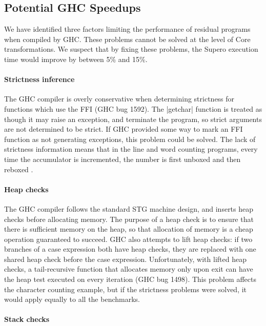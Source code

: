 \documentclass{llncs}
\begin{document}
\subsection{Potential GHC Speedups}

We have identified three factors limiting the performance of residual programs when compiled by GHC. These problems cannot be solved at the level of Core transformations. We suspect that by fixing these problems, the Supero execution time would improve by between 5\% and 15\%.

\paragraph{Strictness inference}

The GHC compiler is overly conservative when determining strictness for functions which use the FFI (GHC bug 1592). The |getchar| function is treated as though it may raise an exception, and terminate the program, so strict arguments are not determined to be strict. If GHC provided some way to mark an FFI function as not generating exceptions, this problem could be solved. The lack of strictness information means that in the line and word counting programs, every time the accumulator is incremented, the number is first unboxed and then reboxed \cite{spj:unboxing}.

\paragraph{Heap checks}

The GHC compiler follows the standard STG machine \cite{spj:implementation} design, and inserts heap checks before allocating memory. The purpose of a heap check is to ensure that there is sufficient memory on the heap, so that allocation of memory is a cheap operation guaranteed to succeed. GHC also attempts to lift heap checks: if two branches of a case expression both have heap checks, they are replaced with one shared heap check before the case expression. Unfortunately, with lifted heap checks, a tail-recursive function that allocates memory only upon exit can have the heap test executed on every iteration (GHC bug 1498). This problem affects the character counting example, but if the strictness problems were solved, it would apply equally to all the benchmarks.

\paragraph{Stack checks}
\end{document}
